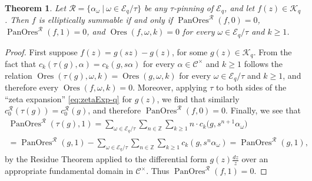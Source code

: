 \documentclass[preprint,12pt]{elsarticle}
\numberwithin{equation}{section} %
\theoremstyle{theorem}
\newtheorem{theorem}{Theorem}[section]
\theoremstyle{definition}
\newcommand{\Cq}{\mathcal{C}} %
\newcommand{\bk}{\mathcal{K}} %
\newcommand{\bkq}{\bk_{q}} %
\newcommand{\ec}{\mathcal{E}} %
\newcommand{\ecq}{\ec_{q}}
\newcommand{\orbitq}{{\ecq/\tau}} %
\DeclareMathOperator{\ores}{Ores}
\DeclareMathOperator{\pano}{PanOres}
\begin{document}
\begin{theorem}\label{thm:mainq} Let $\mathcal{R}=\{\alpha_\omega \ | \ \omega\in\orbitq\}$ be any $\tau$-pinning of $\ecq$, and let $f(z)\in\bkq$. Then $f$ is elliptically summable if and only if $\pano^\mathcal{R}(f,0)=0$, $\pano^\mathcal{R}(f,1)=0$, and $\ores(f,\omega,k)=0$ for every $\omega\in\orbitq$ and $k\geq 1$.
\end{theorem}

\begin{proof} 
   First suppose $f(z)=g(sz)-g(z)$, for some $g(z)\in\bkq$. From the fact that \mbox{$c_k(\tau(g),\alpha)=c_k(g,s\alpha)$} for every $\alpha\in\Cq^\times$ and $k\geq 1$ follows the relation \mbox{$\ores(\tau(g),\omega,k)=\ores(g,\omega,k)$} for every $\omega\in\orbitq$ and $k\geq 1$, and therefore every $\ores(f,\omega,k)=0$. Moreover, applying $\tau$ to both sides of the ``zeta expansion'' \eqref{eq:zetaExp-q} for $g(z)$, we find that similarly $c^\mathcal{R}_0(\tau(g))=c^\mathcal{R}_0(g)$, and therefore $\pano^\mathcal{R}(f,0)=0$. Finally, we see that \begin{multline*}\pano^\mathcal{R}(\tau(g),1) =\sum_{\omega\in\orbitq}\sum_{n\in\mathbb{Z}}\sum_{k\geq 1}n\cdot c_k\bigl(g,s^{n+1}\alpha_\omega\bigr) \\
    =\pano^\mathcal{R}(g,1)-\sum_{\omega\in\orbitq}\sum_{n\in\mathbb{Z}}\sum_{k\geq 1}c_k(g,s^n\alpha_\omega)=\pano^\mathcal{R}(g,1),\end{multline*} by the Residue Theorem \cite[Thm.~2.3.3]{RigidAnalyticGeometry} applied to the differential form $g(z)\frac{dz}{z}$ over an appropriate fundamental domain in $\Cq^\times$. Thus $\pano^\mathcal{R}(f,1)=0$.    


\end{proof}
\end{document}
